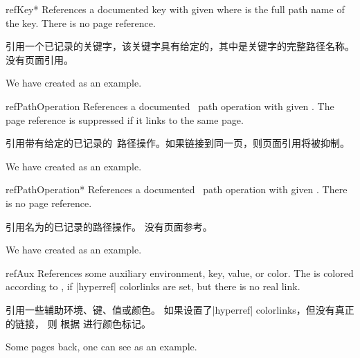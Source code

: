 \begin{docCommand}{refKey*}{}
References a documented key with given  where 
is the full path name of the key.
There is no page reference.

引用一个已记录的关键字，该关键字具有给定的，其中是关键字的完整路径名称。 没有页面引用。
\begin{dispExample}
We have created  as an example.
\end{dispExample}
\end{docCommand}


\begin{docCommand}[doc new=2019-09-17]{refPathOperation}{}
References a documented \tikzname\ path operation with given .
The page reference is suppressed if it links to the same page.

引用带有给定的已记录的\tikzname\ 路径操作。如果链接到同一页，则页面引用将被抑制。
\begin{dispExample}
We have created  as an example.
\end{dispExample}
\end{docCommand}

\begin{docCommand}[doc new=2019-09-17]{refPathOperation*}{}
References a documented \tikzname\ path operation with given .
There is no page reference.

引用名为的已记录的\tikzname 路径操作。 没有页面参考。
\begin{dispExample}
We have created  as an example.
\end{dispExample}
\end{docCommand}



\begin{docCommand}[doc updated=2020-02-11]{refAux}{}
References some auxiliary environment, key, value, or color.
The  is colored according to ,
if |hyperref| colorlinks are set, but there is no real link.

引用一些辅助环境、键、值或颜色。 如果设置了|hyperref| colorlinks，但没有真正的链接， 则  根据  进行颜色标记。
\begin{dispExample}
Some pages back, one can see  as an example.
\end{dispExample}
\end{docCommand}


